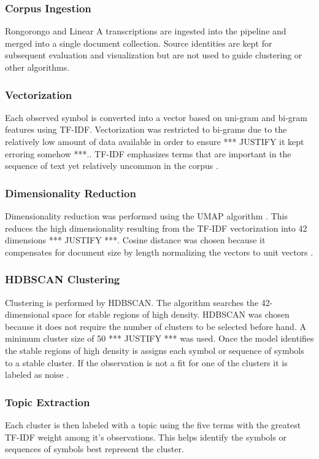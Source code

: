 \documentclass[preprint,12pt]{elsarticle}
\begin{document}
\subsubsection{Corpus Ingestion}
Rongorongo and Linear A transcriptions are ingested into the pipeline and merged into a single document collection.  Source identities are kept for subsequent evaluation and visualization but are not used to guide clustering or other algorithms. 

\subsubsection{Vectorization}
Each observed symbol is converted into a vector based on uni-gram and bi-gram features using TF-IDF.  Vectorization was restricted to bi-grams due to the relatively low amount of data available in order to ensure *** JUSTIFY it kept erroring somehow ***..  TF-IDF emphasizes terms that are important in the sequence of text yet relatively uncommon in the corpus \cite{manning2008_introduction_ir}.  

\subsubsection{Dimensionality Reduction}
Dimensionality reduction was performed using the UMAP algorithm \cite{mcinnes2018_umap}. This reduces the high dimensionality resulting from the TF-IDF vectorization into 42 dimensions *** JUSTIFY ***. Cosine distance was chosen because it compensates for document size by length normalizing the vectors to unit vectors \cite{manning2008_introduction_ir}. 

\subsubsection{HDBSCAN Clustering}
Clustering is performed by HDBSCAN. The algorithm searches the 42-dimensional space for stable regions of high density. HDBSCAN was chosen because it does not require the number of clusters to be selected before hand. A minimum cluster size of 50 *** JUSTIFY *** was used. Once the model identifies the stable regions of high density is assigns each symbol or sequence of symbols to a stable cluster. If the observation is not a fit for one of the clusters it is labeled as noise \cite{campello2015_hierarchical_density_estimates}. 

\subsubsection{Topic Extraction}
Each cluster is then labeled with a topic using the five terms with the greatest TF-IDF weight among it's observations. This helps identify the symbols or sequences of symbols best represent the cluster. 
\end{document}
